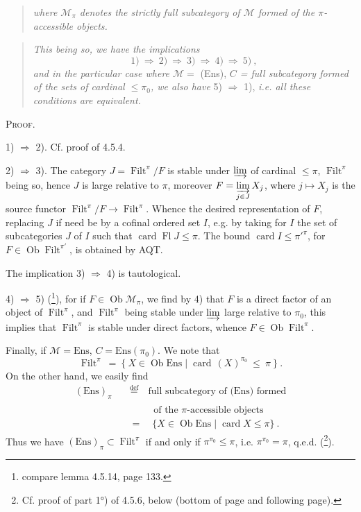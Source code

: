 \documentclass[11pt]{article}
\newcommand{\printedpage}[1]{\marginpar{\footnotesize p.~#1}}
\newcommand{\msp}[1]{\marginpar{\footnotesize [#1]}}
\newcommand{\Filt}{\operatorname{Filt}}
\newcommand{\Ob}{\operatorname{Ob}}
\newcommand{\card}{\operatorname{card}}
\newcommand{\Fl}{\operatorname{Fl}}
\newcommand{\Ens}{\mathrm{Ens}}
\begin{document}
\setcounter{footnote}{39}

\printedpage{34}

\msp{page 117}

\begin{quote}
\textit{where $\mathcal{M}_\pi$ denotes the strictly full subcategory of $\mathcal{M}$ formed of the $\pi$-accessible objects.}
\end{quote}

\begin{quote}
\textit{This being so, we have the implications}
\[
\mathrm{1)} \ \Longrightarrow\ \mathrm{2)} \ \Longrightarrow\ \mathrm{3)} \ \Longrightarrow\ \mathrm{4)} \ \Longrightarrow\ \mathrm{5)} \ ,
\]
\textit{and in the particular case where $\mathcal{M} = $} (Ens), \textit{$C$ = full subcategory formed of the sets of cardinal $\leqslant \pi_0$, we also have} 5) $\Longrightarrow$ 1), \textit{i.e. all these conditions are equivalent.}
\end{quote}

\textsc{Proof.}

1) $\Longrightarrow$ 2). Cf. proof of 4.5.4.

2) $\Longrightarrow$ 3). The category $J = \Filt^\pi/F$ is stable under $\varinjlim$ of cardinal $\leqslant \pi$, $\Filt^\pi$ being so, hence $J$ is large relative to $\pi$, moreover $F = \varinjlim\limits_{j\in J} X_j$, where $j \longmapsto X_j$ is the source functor $\Filt^\pi/F \longrightarrow \Filt^\pi$. Whence the desired representation of $F$, replacing $J$ if need be by a cofinal ordered set $I$, e.g. by taking for $I$ the set of subcategories $J$ of $I$ such that $\card \Fl J \leqslant \pi$. The bound $\card I \leqslant \pi'^{\pi}$, for $F \in \Ob \Filt^{\pi'}$, is obtained by AQT.

The implication 3) $\Longrightarrow$ 4) is tautological.

4) $\Longrightarrow$ 5) (\footnote{compare lemma 4.5.14, page 133.}), for if $F \in \Ob \mathcal{M}_\pi$, we find by 4) that $F$ is a direct factor of an object of $\Filt^\pi$, and $\Filt^\pi$ being stable under $\varinjlim$
\msp{page 118}
large relative to $\pi_0$, this implies that $\Filt^\pi$ is stable under direct factors, whence $F \in \Ob \Filt^\pi$.

Finally, if $\mathcal{M} = \Ens$, $C = \Ens(\pi_0)$. We note that
\[
\Filt^\pi \ = \ \{ \ X \in \Ob \Ens \mid \card\,(X)^{\pi_0} \ \leqslant \ \pi \ \} \ .
\]
On the other hand, we easily find
\[
\begin{aligned}
(\Ens)_\pi \quad &\overset{\text{def}}{=} \quad \text{full subcategory of (Ens) formed} \\
&\phantom{\overset{\text{def}}{=}} \quad \text{of the $\pi$-accessible objects} \\
&= \quad \{ X \in \Ob \Ens \mid \card X \leqslant \pi \} \ .
\end{aligned}
\]
Thus we have $(\Ens)_\pi \subset \Filt^\pi$ if and only if $\pi^{\pi_0} \leqslant \pi$, i.e. $\pi^{\pi_0} = \pi$, q.e.d. (\footnote{Cf. proof of part 1°) of 4.5.6, below (bottom of page and following page).}).
\end{document}
